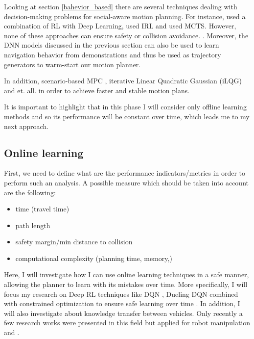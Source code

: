 Looking at section \ref{bahevior_based} there are several techniques dealing with decision-making problems for social-aware motion planning.  For instance, \citeauthor{Chen2017b} used a combination of RL with Deep Learning, \citeauthor{Kretzschmar2016} used IRL and \citeauthor{Lenz2016} used MCTS.
However, none of these approaches can ensure safety or collision avoidance. . Moreover, the DNN models discussed in the previous section can also be used to learn navigation behavior from demonstrations and thus be used as trajectory generators to warm-start our motion planner.

In addition,  \cite{Lenz2015} scenario-based MPC \cite{Schildbach2015}, iterative Linear Quadratic Gaussian (iLQG) \citet{Todorov} and \citeauthor{Mukadam2017} et. all. in order to achieve faster and stable motion plans. 

It is important to highlight that in this phase I will consider only offline learning methods and so its performance will be constant over time, which leads me to my next approach.

\subsection{Online learning}

First, we need to define what are the performance indicators/metrics in order to perform such an analysis. A possible measure which should be taken into account are the following:
\begin{itemize}
        \item time (travel time)
        \item path length
        \item safety margin/min distance to collision
        \item computational complexity (planning time, memory,)   
\end{itemize}

Here, I will investigate how I can use online learning techniques in a safe manner, allowing the planner to learn with its mistakes over time. More specifically, I will focus my research on Deep RL techniques like DQN \cite{mnih2015human}, Dueling DQN \cite{Wang2015} combined with constrained optimization to ensure safe learning over time \cite{Achiam2017}.
In addition, I will also investigate about knowledge transfer between vehicles. Only recently a few research works were presented in this field but applied for robot manipulation \cite{Costante2015} and \cite{Shukla2015}. 

